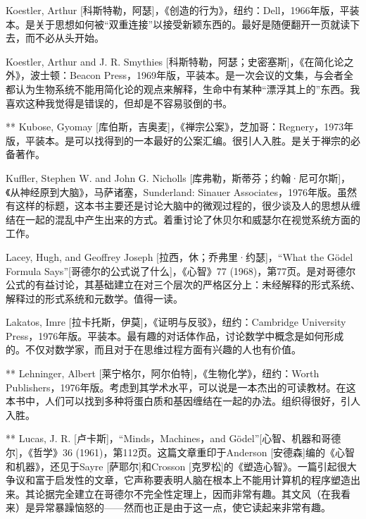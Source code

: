 \begin{thebib}
\begin{biblist}
\item Koestler, Arthur [科斯特勒，阿瑟]，《创造的行为》，纽约：Dell，1966年版，平装本。是关于思想如何被“双重连接”以接受新颖东西的。最好是随便翻开一页就读下去，而不必从头开始。

\item Koestler, Arthur and J. R. Smythies [科斯特勒，阿瑟；史密塞斯]，《在简化论之外》，波士顿：Beacon Press，1969年版，平装本。是一次会议的文集，与会者全都认为生物系统不能用简化论的观点来解释，生命中有某种“漂浮其上的”东西。我喜欢这种我觉得是错误的，但却是不容易驳倒的书。

\item[**] Kubose, Gyomay [库伯斯，吉奥麦]，《禅宗公案》，芝加哥：Regnery，1973年版，平装本。是可以找得到的一本最好的公案汇编。很引人入胜。是关于禅宗的必备著作。

\item Kuffler, Stephen W. and John G. Nicholls [库弗勒，斯蒂芬；约翰·尼可尔斯]，《从神经原到大脑》，马萨诸塞，Sunderland: Sinauer Associates，1976年版。虽然有这样的标题，这本书主要还是讨论大脑中的微观过程的，很少谈及人的思想从缠结在一起的混乱中产生出来的方式。着重讨论了休贝尔和威瑟尔在视觉系统方面的工作。

\item Lacey, Hugh, and Geoffrey Joseph [拉西，休；乔弗里·约瑟]，“What the Gödel Formula Says”[哥德尔的公式说了什么]，《心智》77 (1968)，第77页。是对哥德尔公式的有益讨论，其基础建立在对三个层次的严格区分上：未经解释的形式系统、解释过的形式系统和元数学。值得一读。

\item Lakatos, Imre [拉卡托斯，伊莫]，《证明与反驳》，纽约：Cambridge University Press，1976年版。平装本。最有趣的对话体作品，讨论数学中概念是如何形成的。不仅对数学家，而且对于在思维过程方面有兴趣的人也有价值。

\item[**] Lehninger, Albert [莱宁格尔，阿尔伯特]，《生物化学》，纽约：Worth Publishers，1976年版。考虑到其学术水平，可以说是一本杰出的可读教材。在这本书中，人们可以找到多种将蛋白质和基因缠结在一起的办法。组织得很好，引人入胜。

\item[**] Lucas, J. R. [卢卡斯]，“Minds，Machines，and Gödel”[心智、机器和哥德尔]，《哲学》36 (1961)，第112页。这篇文章重印于Anderson [安德森]编的《心智和机器》，还见于Sayre [萨耶尔]和Crosson [克罗松]的《塑造心智》。一篇引起很大争议和富于启发性的文章，它声称要表明人脑在根本上不能用计算机的程序塑造出来。其论据完全建立在哥德尔不完全性定理上，因而非常有趣。其文风（在我看来）是异常暴躁恼怒的——然而也正是由于这一点，使它读起来非常有趣。


\end{biblist}
\end{thebib}
